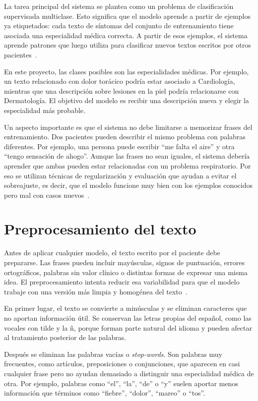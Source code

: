 La tarea principal del sistema se plantea como un problema de clasificación supervisada multiclase. Esto significa que el modelo aprende a partir de ejemplos ya etiquetados: cada texto de síntomas del conjunto de entrenamiento tiene asociada una especialidad médica correcta. A partir de esos ejemplos, el sistema aprende patrones que luego utiliza para clasificar nuevos textos escritos por otros pacientes~\cite{ibm_clasificacion, LopezUbeda2025}.

En este proyecto, las clases posibles son las especialidades médicas. Por ejemplo, un texto relacionado con dolor torácico podría estar asociado a Cardiología, mientras que una descripción sobre lesiones en la piel podría relacionarse con Dermatología. El objetivo del modelo es recibir una descripción nueva y elegir la especialidad más probable.

Un aspecto importante es que el sistema no debe limitarse a memorizar frases del entrenamiento. Dos pacientes pueden describir el mismo problema con palabras diferentes. Por ejemplo, una persona puede escribir ``me falta el aire'' y otra ``tengo sensación de ahogo''. Aunque las frases no sean iguales, el sistema debería aprender que ambas pueden estar relacionadas con un problema respiratorio. Por eso se utilizan técnicas de regularización y evaluación que ayudan a evitar el sobreajuste, es decir, que el modelo funcione muy bien con los ejemplos conocidos pero mal con casos nuevos~\cite{aws_sobreajuste}.

\section{Preprocesamiento del texto}

Antes de aplicar cualquier modelo, el texto escrito por el paciente debe prepararse. Las frases pueden incluir mayúsculas, signos de puntuación, errores ortográficos, palabras sin valor clínico o distintas formas de expresar una misma idea. El preprocesamiento intenta reducir esa variabilidad para que el modelo trabaje con una versión más limpia y homogénea del texto~\cite{snowflake_pln, ibm_stemming}.

En primer lugar, el texto se convierte a minúsculas y se eliminan caracteres que no aportan información útil. Se conservan las letras propias del español, como las vocales con tilde y la ñ, porque forman parte natural del idioma y pueden afectar al tratamiento posterior de las palabras.

Después se eliminan las palabras vacías o \textit{stop-words}. Son palabras muy frecuentes, como artículos, preposiciones o conjunciones, que aparecen en casi cualquier frase pero no ayudan demasiado a distinguir una especialidad médica de otra. Por ejemplo, palabras como ``el'', ``la'', ``de'' o ``y'' suelen aportar menos información que términos como ``fiebre'', ``dolor'', ``mareo'' o ``tos''.

